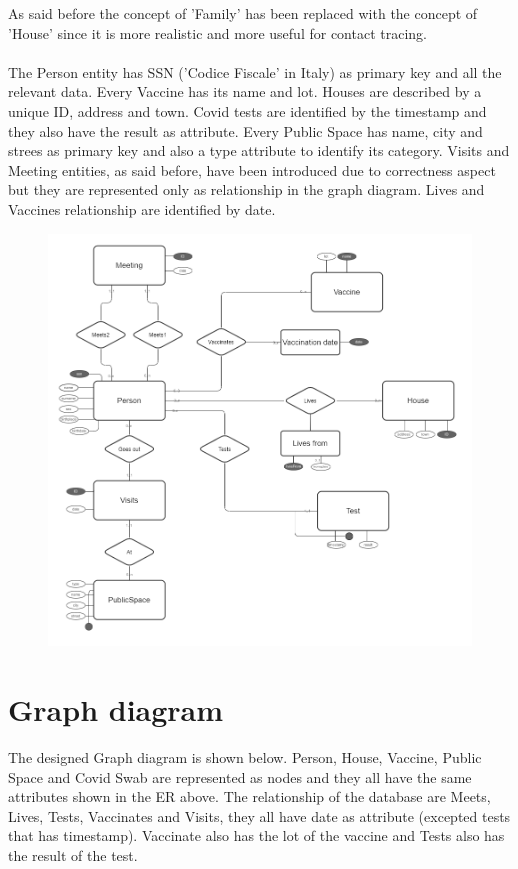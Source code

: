 \documentclass{article}
\begin{document}
As said before the concept of 'Family' has been replaced with the concept of 'House' since it is more realistic and more useful for contact tracing.
\\
\\The Person entity has SSN ('Codice Fiscale' in Italy) as primary key and all the relevant data. Every Vaccine has its name and lot. Houses are described by a unique ID, address and town. 
Covid tests are identified by the timestamp and they also have the result as attribute. Every Public Space has name, city and strees as primary key and also a type attribute to identify its category.
Visits and Meeting entities, as said before, have been introduced due to correctness aspect but they are represented only as relationship in the graph diagram. Lives and Vaccines relationship are identified by date. 

\begin{figure}[h]
\centering 
\includegraphics[scale=0.25]{er.png} 
\end{figure}
\newpage

\section{Graph diagram}
The designed Graph diagram is shown below. Person, House, Vaccine, Public Space and Covid Swab are represented as nodes and they all have the same attributes shown in the ER above. The relationship of the database are Meets, Lives, Tests, Vaccinates and Visits, they all have date as attribute (excepted tests that has timestamp). Vaccinate also has the lot of the vaccine and Tests also has the result of the test.
\end{document}
